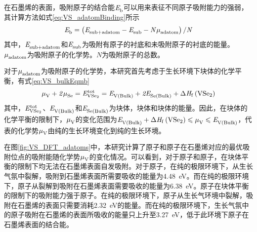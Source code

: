     在石墨烯的表面，吸附原子的结合能$\it E_{\rm b}^{\rm } \it$可以用来表征不同原子吸附能力的强弱，其计算方法如式\eqref{eq:VS_adatomBinding}所示\chinesecolon
    \begin{equation}
        \label{eq:VS_adatomBinding}
        \it E_{\rm b}^{\rm } \it=\left(\it E_{\rm sub+adatom}^{\rm } \it-\it E_{\rm sub}^{\rm } \it-N\it \mu_{\rm adatom}^{\rm } \it\right)/ N
    \end{equation}
    其中，$\it E_{\rm sub+adatom}^{\rm } \it$和$\it E_{\rm sub}^{\rm } \it$为吸附有原子的衬底和未吸附原子的衬底的能量。$\it \mu_{\rm adatom}^{\rm } \it$为吸附原子的化学势。$N$为吸附原子的总数。

    对于$\it \mu_{\rm adatom}^{\rm } \it$为吸附原子的化学势，本研究首先考虑于生长环境下块体的化学平衡，有式\eqref{eq:VS_bulkEqmb}\chinesecolon
    \begin{equation}
        \label{eq:VS_bulkEqmb}
        \muVar{V}{}+2\muVar{Se}{}=\energyVar{\ce{VSe2}}{tot}=\energyVar{V\left(Bulk\right)}{}+2\energyVar{Se\left(Bulk\right)}{}+\rm{\Delta} \it H_{\rm f}\left(\ce{VSe2}\right)
    \end{equation}
    其中，$\energyVar{\ce{VSe2}}{tot}$、$\it E_{\rm V\left(Bulk\right)}^{\rm } \it$和$\it E_{\rm Se\left(Bulk\right)}^{\rm } \it$为块体，块体和块体的能量。因此，在块体的化学平衡的限制下，$\it \mu_{\rm V}^{\rm } \it$的变化范围为$\energyVar{V\left(Bulk\right)}{}+\rm{\Delta} \it H_{\rm f}\left(\ce{VSe2}\right) \leqslant \muVar{V}{}  \leqslant \energyVar{V\left(Bulk\right)}{}$，代表的化学势$\it \mu_{\rm V}^{\rm } \it$由纯的生长环境变化到纯的生长环境。

    在图\ref{fig:VS_DFT_adatoms}中，本研究计算了原子和原子在石墨烯对应的最优吸附位点的吸附能随化学势$\it \mu_{\rm V}^{\rm } \it$的变化情况。可以看到，对于原子和原子，在块体平衡的限制下均无法在石墨烯表面自发吸附。对于原子，在纯的极限环境下，从生长气氛中裂解，吸附到石墨烯表面所需要吸收的能量为\SI{4.48}{\electronvolt}。而在纯的极限环境下，原子从裂解到吸附在石墨烯表面需要吸收的能量为\SI{6.38}{\electronvolt}。原子在块体平衡的限制下的吸附能力强于原子。在纯的极限环境下，原子从生长气环境中裂解，吸附在石墨烯的表面只需要消耗\SI{2.32}{\electronvolt}的能量。而在纯的极限环境下，生长气氛中的原子吸附在石墨烯的表面所吸收的能量只上升至\SI{3.27}{\electronvolt}，低于此环境下原子在石墨烯表面的结合能。

